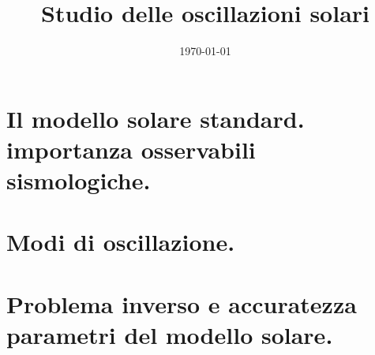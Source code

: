 \documentclass[twoside,11pt,fleqn]{memoir}%
\author{ }
\title{Studio delle oscillazioni solari}
\date{\today}
\begin{document}
\frontmatter
{}
\maketitle

\tableofcontents

%

\cleardoublepage

\mainmatter


\part{Il modello solare standard. importanza osservabili sismologiche.}



\part{Modi di oscillazione.}



\part{Problema inverso e accuratezza parametri del modello solare.}



\backmatter

%

\printbibliography
\end{document}
